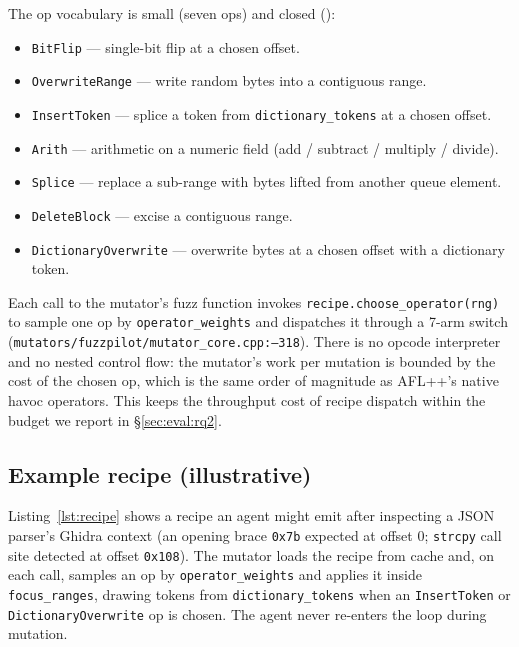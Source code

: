 \documentclass[11pt]{article}
\begin{document}
The op vocabulary is small (seven ops) and closed
():

\begin{itemize}
  \item \texttt{BitFlip} --- single-bit flip at a chosen offset.
  \item \texttt{OverwriteRange} --- write random bytes into a
  contiguous range.
  \item \texttt{InsertToken} --- splice a token from
  \texttt{dictionary\_tokens} at a chosen offset.
  \item \texttt{Arith} --- arithmetic on a numeric field
  (add / subtract / multiply / divide).
  \item \texttt{Splice} --- replace a sub-range with bytes lifted
  from another queue element.
  \item \texttt{DeleteBlock} --- excise a contiguous range.
  \item \texttt{DictionaryOverwrite} --- overwrite bytes at a
  chosen offset with a dictionary token.
\end{itemize}

Each call to the mutator's fuzz function invokes
\texttt{recipe.choose\_operator(rng)} to sample one op by
\texttt{operator\_weights} and dispatches it through a 7-arm
switch (\texttt{mutators/fuzzpilot/\allowbreak mutator\_core.cpp:--318}).
There is no opcode interpreter and no nested control flow: the
mutator's work per mutation is bounded by the cost of the chosen
op, which is the same order of magnitude as AFL++'s native havoc
operators. This keeps the throughput cost of recipe dispatch within
the budget we report in \S\ref{sec:eval:rq2}.

\subsection{Example recipe (illustrative)}
\label{sec:recipe:example}

Listing~\ref{lst:recipe} shows a recipe an agent might emit after
inspecting a JSON parser's Ghidra context (an opening brace
\texttt{0x7b} expected at offset 0; \texttt{strcpy} call site
detected at offset \texttt{0x108}). The mutator loads the recipe
from cache and, on each call, samples an op by
\texttt{operator\_weights} and applies it inside
\texttt{focus\_ranges}, drawing tokens from \texttt{dictionary\_tokens}
when an \texttt{InsertToken} or \texttt{DictionaryOverwrite} op is
chosen. The agent never re-enters the loop during mutation.
\end{document}
